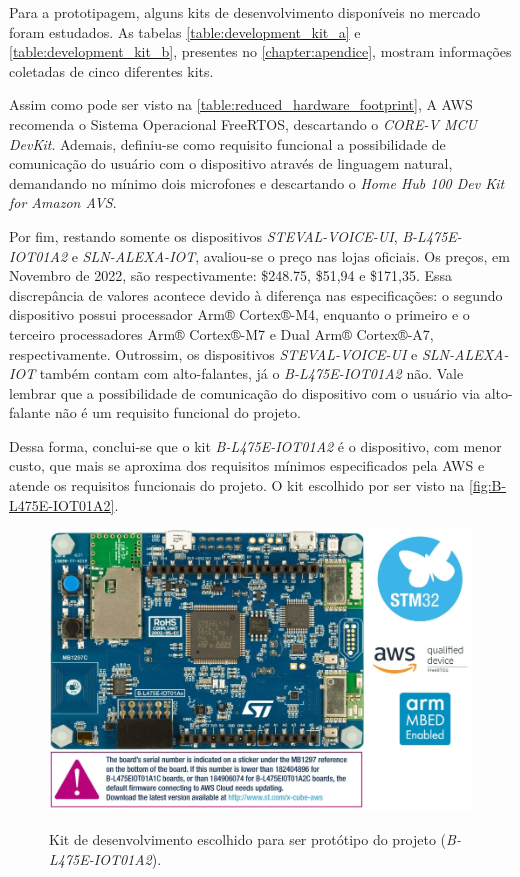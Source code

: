 Para a prototipagem, alguns kits de desenvolvimento disponíveis no mercado foram estudados. As tabelas \autoref{table:development_kit_a} e \autoref{table:development_kit_b}, presentes no \autoref{chapter:apendice}, mostram informações coletadas de cinco diferentes kits.

Assim como pode ser visto na \autoref{table:reduced_hardware_footprint}, A AWS recomenda o Sistema Operacional FreeRTOS, descartando o \textit{CORE-V MCU DevKit}. Ademais, definiu-se como requisito funcional a possibilidade de comunicação do usuário com o dispositivo através de linguagem natural, demandando no mínimo dois microfones e descartando o \textit{Home Hub 100 Dev Kit for Amazon AVS}.

Por fim, restando somente os dispositivos \textit{STEVAL-VOICE-UI}, \textit{B-L475E-IOT01A2} e \textit{SLN-ALEXA-IOT}, avaliou-se o preço nas lojas oficiais. Os preços, em Novembro de 2022, são respectivamente: \$248.75, \$51,94 e \$171,35. Essa discrepância de valores acontece devido à diferença nas especificações: o segundo dispositivo possui processador Arm® Cortex®-M4, enquanto o primeiro e o terceiro processadores Arm® Cortex®-M7 e Dual Arm® Cortex®-A7, respectivamente. Outrossim, os dispositivos \textit{STEVAL-VOICE-UI} e \textit{SLN-ALEXA-IOT} também contam com alto-falantes, já o \textit{B-L475E-IOT01A2} não. Vale lembrar que a possibilidade de comunicação do dispositivo com o usuário via alto-falante não é um requisito funcional do projeto.

Dessa forma, conclui-se que o kit \textit{B-L475E-IOT01A2} é o dispositivo, com menor custo, que mais se aproxima dos requisitos mínimos especificados pela AWS e atende os requisitos funcionais do projeto. O kit escolhido por ser visto na \autoref{fig:B-L475E-IOT01A2}.

\begin{figure}[htbp]
    \centering
    \caption{Kit de desenvolvimento escolhido para ser protótipo do projeto (\textit{B-L475E-IOT01A2}).}
    \includegraphics[scale=0.7]{Imagens/B-L475E-IOT01A2.png}
    \label{fig:B-L475E-IOT01A2}
\end{figure}

